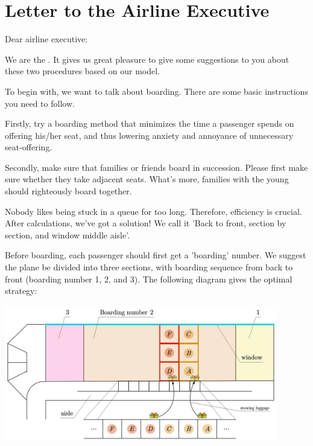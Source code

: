 \documentclass{article}
\theoremstyle{definition}
\theoremstyle{remark}
\numberwithin{equation}{section}
\begin{document}
	\newpage

	\clearpage
	\thispagestyle{empty}
	\section{Letter to the Airline Executive}
	\noindent Dear airline executive:

	We are the .  It gives us great pleasure to give some suggestions to you about these two procedures based on our model.

	To begin with, we want to talk about boarding. There are some basic instructions you need to follow.

	\begin{itemize}

		Firstly, try a boarding method that minimizes the time a passenger spends on offering his/her seat, and thus lowering anxiety and annoyance of unnecessary seat-offering.

  		Secondly, make sure that families or friends board in succession. Please first make sure whether they take adjacent seats. What's more, families with the young should righteously board together.

		Nobody likes being stuck in a queue for too long. Therefore, efficiency  is crucial. After calculations, we've got a solution! We call it 'Back to front, section by section, and window middle aisle'.

		Before boarding, each passenger should first get a 'boarding' number. We suggest the plane be divided into three sections, with boarding sequence from back to front (boarding number 1, 2, and 3).  The following diagram gives the optimal strategy:
		\begin{center}
			\includegraphics[width=12cm]{advice-ver3.jpg}
		\end{center}
	\end{itemize}
\end{document}
